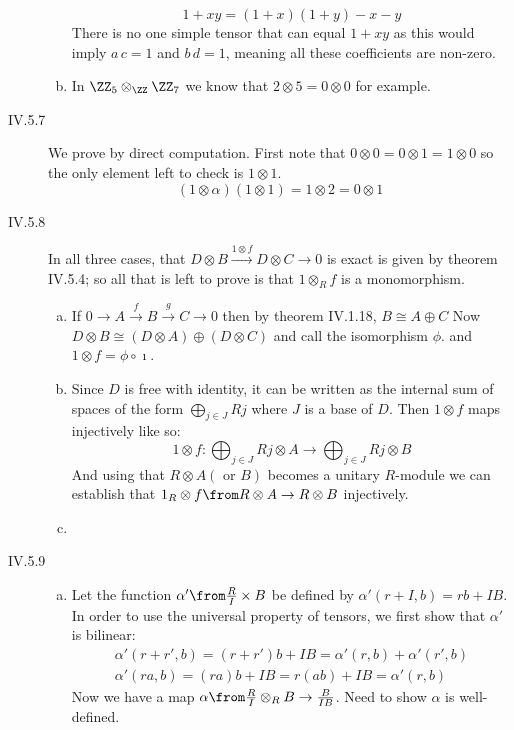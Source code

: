 \begin{description}
\begin{enumerate}[(a)]
            $$1+xy= (1+x)(1+y) - x - y$$
            There is no one simple tensor that can equal $1+xy$ as this would imply $a\,c=1$ and $b\,d=1$, meaning all these coefficients are non-zero.
        \item In $\ZZ_5\otimes_\ZZ \ZZ_7$ we know that $2\otimes 5=0\otimes 0$ for example.
    \end{enumerate}
\item[IV.5.7] We prove by direct computation. First note that $0\otimes 0 = 0\otimes 1 = 1\otimes 0$ so the only element left to check is $1\otimes 1$.
    $$(1\otimes\alpha)(1\otimes 1) = 1\otimes 2 = 0\otimes 1$$
\item[IV.5.8]
    In all three cases, that $D\otimes B \xrightarrow{1\otimes f} D\otimes C \to 0$ is exact is given by theorem IV.5.4; so all that is left to prove is that $1\otimes_R f$ is a monomorphism.
    \begin{enumerate}[(a)]
        \item If $0\to A \xrightarrow{f} B\xrightarrow{g} C \to 0$ then by theorem IV.1.18, $B\cong A\oplus C$  Now $D\otimes B\cong (D\otimes A)\oplus(D\otimes C)$ and call the isomorphism $\phi$. and $1\otimes f = \phi \circ \imath$. 
        \item Since $D$ is free with identity, it can be written as the internal sum of spaces of the form $\bigoplus_{j\in J} Rj$ where $J$ is a base of $D$. Then $1\otimes f$ maps injectively like so:
            $$1\otimes f : \bigoplus_{j\in J} Rj\otimes A \to \bigoplus_{j\in J} Rj\otimes B$$
            And using that $R\otimes A(\text{ or } B)$ becomes a unitary  $R$-module we can establish that $1_R\otimes f\from R\otimes A \to R\otimes B$ injectively.
        \item 

    \end{enumerate}
\item[IV.5.9]
    \begin{enumerate}[(a)]
        \item Let the function $\alpha'\from \frac RI \times B$ be defined by $\alpha'(r+I,b) = rb + IB$. In order to use the universal property of tensors, we first show that $\alpha'$ is bilinear:
            \begin{gather*}
                \alpha'(r+r',b) = (r+r')b+ IB = \alpha'(r,b) + \alpha'(r',b)\\
                \alpha'(ra ,b) = (ra)b +IB = r(ab) +IB=\alpha'(r,b)
            \end{gather*}
            Now we have a map $\alpha\from \frac RI \otimes_R B \to \frac B{IB}$. Need to show $\alpha$ is well-defined. 


\end{enumerate}
\end{description}
